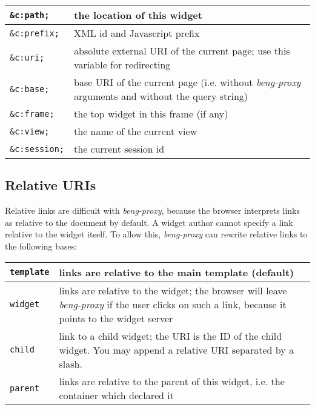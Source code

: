 \documentclass[a4paper,12pt]{article}
\begin{document}
\begin{tabular}{|l|p{8cm}|}
\hline
\texttt{\&c:path;} & the location of this widget \\
\hline
\texttt{\&c:prefix;} & XML id and Javascript prefix \\
\hline
\texttt{\&c:uri;} & absolute external URI of the current page; use
this variable for redirecting \\
\hline

\texttt{\&c:base;} & base URI of the current page (i.e. without
\emph{beng-proxy} arguments and without the query string) \\

\hline
\texttt{\&c:frame;} & the top widget in this frame (if any) \\
\hline

\texttt{\&c:view;} & the name of the current view \\

\hline
\texttt{\&c:session;} & the current session id \\
\hline
\end{tabular}

\subsection{Relative URIs}
\label{rewrite}

Relative links are difficult with \emph{beng-proxy}, because the
browser interprets links as relative to the document by default.  A
widget author cannot specify a link relative to the widget itself.  To
allow this, \emph{beng-proxy} can rewrite relative links to the
following bases:

\begin{tabular}{|l|p{10cm}|}
\hline

\texttt{template} & links are relative to the main template (default)
\\

\hline

\texttt{widget} & links are relative to the widget; the browser will
leave \emph{beng-proxy} if the user clicks on such a link, because it
points to the widget server \\

\hline

\texttt{child} & link to a child widget; the URI is the ID of the
child widget.  You may append a relative URI separated by a slash. \\

\hline

\texttt{parent} & links are relative to the parent of this widget,
i.e. the container which declared it \\

\hline
\end{tabular}
\end{document}
